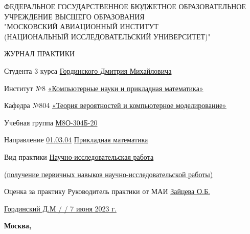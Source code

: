 \begin{titlepage}
\begin{center}
\bfseries

{\Large ФЕДЕРАЛЬНОЕ ГОСУДАРСТВЕННОЕ БЮДЖЕТНОЕ ОБРАЗОВАТЕЛЬНОЕ\\ УЧРЕЖДЕНИЕ ВЫСШЕГО ОБРАЗОВАНИЯ\\ "МОСКОВСКИЙ АВИАЦИОННЫЙ ИНСТИТУТ\\ (НАЦИОНАЛЬНЫЙ ИССЛЕДОВАТЕЛЬСКИЙ УНИВЕРСИТЕТ)"

}

\vspace{56pt}

{\large ЖУРНАЛ ПРАКТИКИ 

}

\end{center}

\vspace{36pt}

Студента 3 курса \hspace{3cm}        \underline{Гординского Дмитрия Михайловича}

\vspace{26pt}

Институт №8 \underline{«Компьютерные науки и прикладная математика»}

\vspace{26pt}

Кафедра №804 \underline{«Теория вероятностей и компьютерное моделирование»}

\vspace{26pt}

Учебная группа \underline{М8О-304Б-20}

\vspace{26pt}

Направление \underline{01.03.04} \hspace{3cm} \underline{Прикладная математика}

\vspace{26pt}

Вид практики \underline{Научно-исследовательская работа }

\vspace{4pt}

\underline{(получение первичных навыков научно-исследовательской работы)}

\vspace{26pt}

Оценка за практику \underline{ \hspace{3cm}} Руководитель практики от МАИ \underline{Зайцева О.Б.}

\vspace{46pt}

\underline{Гординский Д.М / \hspace{3cm} / 7 июня 2023 г.}

\vfill

\begin{center}
\bfseries
Москва, \the\year
\end{center}
\end{titlepage}

\pagebreak
